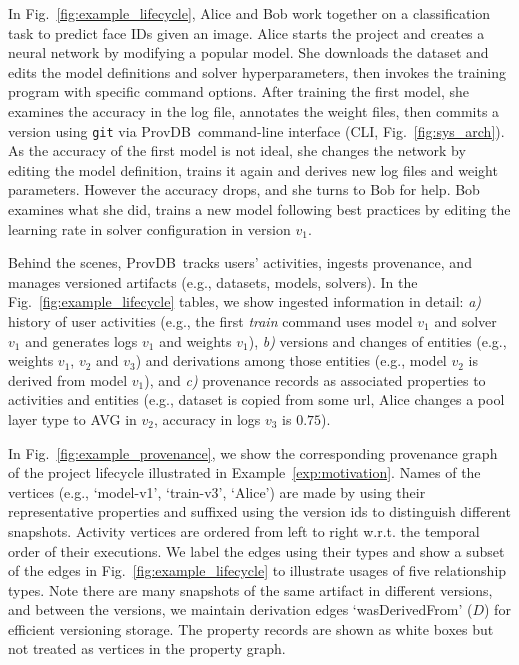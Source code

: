 \documentclass[11pt]{article}
\newcommand{\provdb}{{\sc ProvDB}\xspace}
\newcommand{\cmd}[1]{{\tt #1}}
\newcommand{\wasDerivedFrom}{$\mathit D$}
\begin{document}
\begin{example}
\label{exp:motivation}
In Fig.~\ref{fig:example_lifecycle}, Alice and Bob work together on a classification task to predict face IDs given an image. Alice starts the project and creates a neural network by modifying a popular model. She downloads the dataset and edits the model definitions and solver hyperparameters, then invokes the training program with specific command options. After training the first model, she examines the accuracy in the log file, annotates the weight files, then commits a version using \cmd{git} via \provdb\ command-line interface (CLI, Fig.~\ref{fig:sys_arch}). As the accuracy of the first model is not ideal, she changes the network  by editing the model definition, trains it again and derives new log files and weight parameters. However the accuracy drops, and she turns to Bob for help. Bob examines what she did, trains a new model following best practices by editing the learning rate in solver configuration in version $v_1$.

Behind the scenes, \provdb\  tracks users' activities, ingests provenance, and manages versioned artifacts (e.g., datasets, models, solvers). In the Fig.~\ref{fig:example_lifecycle} tables, we show ingested information in detail: \emph{a)} history of user activities (e.g., the first \emph{train} command uses model $v_1$ and solver $v_1$ and generates logs $v_1$ and weights $v_1$), \emph{b)} versions and changes of entities (e.g., weights $v_1$, $v_2$ and $v_3$) and derivations among those entities (e.g., model $v_2$ is derived from model $v_1$), and \emph{c)} provenance records as associated properties to activities and entities (e.g., dataset is copied from some url, Alice changes a pool layer type to AVG in $v_2$, accuracy in logs $v_3$ is $0.75$).
\end{example} 

\begin{example}
\label{exp:motivation_in_prov}
In Fig.~\ref{fig:example_provenance}, we show the corresponding provenance graph of the project lifecycle illustrated in Example~\ref{exp:motivation}.
Names of the vertices (e.g., `model-v1', `train-v3', `Alice') are made by using their representative properties and suffixed using the version ids to distinguish different snapshots. 
Activity vertices are ordered from left to right w.r.t. the temporal order of their executions.
We label the edges using their types and show a subset of the edges in Fig.~\ref{fig:example_lifecycle} to illustrate usages of five relationship types.
    Note there are many snapshots of the same artifact in different versions, and between the versions, we maintain derivation edges `wasDerivedFrom' (\wasDerivedFrom) for efficient versioning storage. 
The property records are shown as white boxes but not treated as vertices in the property graph. 
\end{example} 
\end{document}
